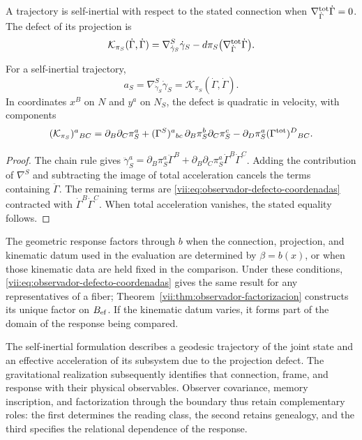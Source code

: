 \begin{definition}
\label{vii:def:observador-autoinercia}
A trajectory is self-inertial with respect to the stated connection
when \(\nabla^{\rm tot}_{\dot\Gamma}\dot\Gamma=0\).
The defect of its projection is
\begin{equation}
 \mathcal K_{\pi_S}(\dot\Gamma,\dot\Gamma)
 =\nabla^S_{\dot\gamma_S}\dot\gamma_S
  -d\pi_S\bigl(\nabla^{\rm tot}_{\dot\Gamma}\dot\Gamma\bigr).
 \label{vii:eq:observador-defecto-proyeccion}
\end{equation}
\end{definition}

\begin{proposition}
\label{vii:prop:observador-aceleracion}
For a self-inertial trajectory,
\[
 a_S=\nabla^S_{\dot\gamma_S}\dot\gamma_S
     =\mathcal K_{\pi_S}(\dot\Gamma,\dot\Gamma).
\]
In coordinates \(x^B\) on \(N\) and \(y^a\) on \(N_S\), the
defect is quadratic in velocity, with components
\begin{equation}
 (\mathcal K_{\pi_S})^a{}_{BC}
 =\partial_B\partial_C\pi_S^a
  +(\Gamma^S)^a{}_{bc}\,
        \partial_B\pi_S^b\partial_C\pi_S^c
  -\partial_D\pi_S^a(\Gamma^{\rm tot})^D{}_{BC}.
 \label{vii:eq:observador-defecto-coordenadas}
\end{equation}
\end{proposition}

\begin{proof}
The chain rule gives
\(\ddot\gamma_S^a=\partial_B\pi_S^a\ddot\Gamma^B
 +\partial_B\partial_C\pi_S^a\dot\Gamma^B\dot\Gamma^C\).
Adding the contribution of \(\nabla^S\) and subtracting the image
of total acceleration cancels the terms containing \(\ddot\Gamma\).
The remaining terms are
\eqref{vii:eq:observador-defecto-coordenadas} contracted with
\(\dot\Gamma^B\dot\Gamma^C\). When total acceleration vanishes,
the stated equality follows.
\end{proof}

The geometric response factors through \(b\) when the connection,
projection, and kinematic datum used in the evaluation are
determined by \(\beta=b(x)\), or when those kinematic data are
held fixed in the comparison. Under these conditions,
\eqref{vii:eq:observador-defecto-coordenadas} gives the same result
for any representatives of a fiber;
Theorem~\ref{vii:thm:observador-factorizacion} constructs its unique
factor on \(B_{\rm ef}\). If the kinematic datum varies, it
forms part of the domain of the response being compared.

The self-inertial formulation describes a geodesic trajectory of the
joint state and an effective acceleration of its subsystem due to
the projection defect. The gravitational realization subsequently
identifies that connection, frame, and response with their physical
observables. Observer covariance, memory inscription, and
factorization through the boundary thus retain complementary roles:
the first determines the reading class, the second retains
genealogy, and the third specifies the relational dependence of the
response.
